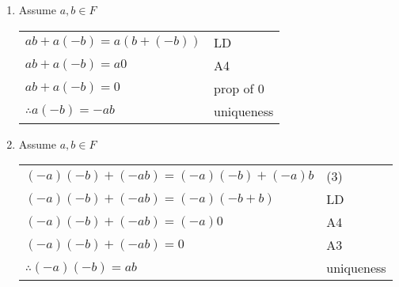 \documentclass[letterpaper,12pt,fleqn]{article}
\begin{document}
\begin{theproof}
\begin{enumerate}
\item{Assume $a,b\in F$}

\begin{tabular}{ll}
$ab+a(-b)=a(b+(-b))$ & LD \\
$ab+a(-b)=a0$ & A4 \\
$ab+a(-b)=0$ & prop of 0 \\
$\therefore a(-b)=-ab$ & uniqueness \\
\end{tabular}

\item{Assume $a,b\in F$}

\begin{tabular}{ll}
$(-a)(-b)+(-ab)=(-a)(-b)+(-a)b$ & (3) \\
$(-a)(-b)+(-ab)=(-a)(-b+b)$ & LD \\
$(-a)(-b)+(-ab)=(-a)0$ & A4 \\
$(-a)(-b)+(-ab)=0$ & A3 \\
$\therefore (-a)(-b)=ab$ & uniqueness \\
\end{tabular}
\end{enumerate}
\end{theproof}
\end{document}
